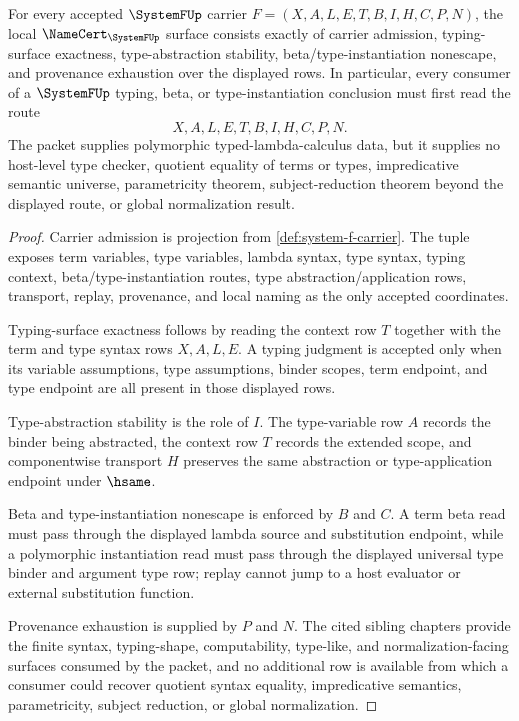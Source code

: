 \begin{theorem}
\label{thm:system-f-namecert-obligations}
For every accepted $\SystemFUp$ carrier $F=(X,A,L,E,T,B,I,H,C,P,N)$, the local $\NameCert_{\SystemFUp}$ surface consists exactly of carrier admission, typing-surface exactness, type-abstraction stability, beta/type-instantiation nonescape, and provenance exhaustion over the displayed rows. In particular, every consumer of a $\SystemFUp$ typing, beta, or type-instantiation conclusion must first read the route
$$
X,A,L,E,T,B,I,H,C,P,N .
$$
The packet supplies polymorphic typed-lambda-calculus data, but it supplies no host-level type checker, quotient equality of terms or types, impredicative semantic universe, parametricity theorem, subject-reduction theorem beyond the displayed route, or global normalization result.
\end{theorem}
\begin{proof}
Carrier admission is projection from \autoref{def:system-f-carrier}. The tuple exposes term variables, type variables, lambda syntax, type syntax, typing context, beta/type-instantiation routes, type abstraction/application rows, transport, replay, provenance, and local naming as the only accepted coordinates.

Typing-surface exactness follows by reading the context row $T$ together with the term and type syntax rows $X,A,L,E$. A typing judgment is accepted only when its variable assumptions, type assumptions, binder scopes, term endpoint, and type endpoint are all present in those displayed rows.

Type-abstraction stability is the role of $I$. The type-variable row $A$ records the binder being abstracted, the context row $T$ records the extended scope, and componentwise transport $H$ preserves the same abstraction or type-application endpoint under $\hsame$.

Beta and type-instantiation nonescape is enforced by $B$ and $C$. A term beta read must pass through the displayed lambda source and substitution endpoint, while a polymorphic instantiation read must pass through the displayed universal type binder and argument type row; replay cannot jump to a host evaluator or external substitution function.

Provenance exhaustion is supplied by $P$ and $N$. The cited sibling chapters provide the finite syntax, typing-shape, computability, type-like, and normalization-facing surfaces consumed by the packet, and no additional row is available from which a consumer could recover quotient syntax equality, impredicative semantics, parametricity, subject reduction, or global normalization.
\end{proof}

